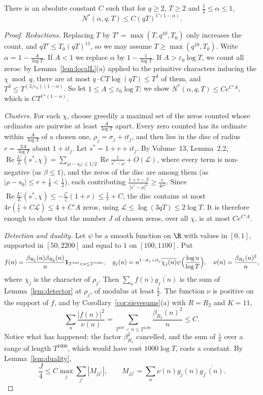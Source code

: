 \begin{theorem}\label{thm:logfree}
There is an absolute constant $C$ such that for $q\ge2$, $T\ge2$ and $\frac12\le\alpha\le1$,
\[
N^*(\alpha,q,T)\le C(qT)^{C(1-\alpha)}.
\]
\end{theorem}
\begin{proof}
\emph{Reductions.} Replacing $T$ by $T'=\max(T,q^{10},T_0)$ only increases the count, and $qT'\le T_0(qT)^{11}$, so we may assume $T\ge\max(q^{10},T_0)$. Write $\alpha=1-\frac A{\log T}$. If $A<1$ we replace $\alpha$ by $1-\frac1{\log T}$. If $A>\varepsilon_0\log T$, we count all zeros: by Lemma~\ref{lem:localL}(a) applied to the primitive characters inducing the $\chi\bmod q$, there are at most $q\cdot CT\log(qT)\le T^3$ of them, and $T^3\le T^{(3/\varepsilon_0)(1-\alpha)}$. So let $1\le A\le\varepsilon_0\log T$; we show $N^*(\alpha,q,T)\le Ce^{C'A}$, which is $CT^{C'(1-\alpha)}$.

\emph{Clusters.} For each $\chi$, choose greedily a maximal set of the zeros counted whose ordinates are pairwise at least $\frac A{\log T}$ apart. Every zero counted has its ordinate within $\frac A{\log T}$ of a chosen one, $\rho_j=\sigma_j+it_j$, and then lies in the disc of radius $r=\frac{2A}{\log T}$ about $1+it_j$. Let $s^*=1+r+it_j$. By Volume~13, Lemma~2.2, $\operatorname{Re}\frac{L'}L(s^*,\chi)=\sum_{|\rho-s_0|\le1/2}\operatorname{Re}\frac1{s^*-\rho}+O(\mathcal L)$, where every term is non-negative (as $\beta\le1$), and the zeros of the disc are among them (as $|\rho-s_0|\le r+\frac18<\frac12$), each contributing $\frac{1+r-\beta}{|s^*-\rho|^2}\ge\frac r{4r^2}$. Since $\operatorname{Re}\frac{L'}L(s^*,\chi)\le-\frac{\zeta'}\zeta(1+r)\le\frac1r+C$, the disc contains at most $4r(\frac1r+C\mathcal L)\le4+C'A$ zeros, using $\mathcal L\le\log(3qT)\le2\log T$. It is therefore enough to show that the number $J$ of chosen zeros, over all $\chi$, is at most $Ce^{C'A}$.

\emph{Detection and duality.} Let $\psi$ be a smooth function on $\R$ with values in $[0,1]$, supported in $[50,2200]$ and equal to $1$ on $[100,1100]$. Put
\[
f(n)=\frac{\beta_{R_1}(n)\beta_{R_2}(n)}n\mathbf 1_{T^{100}<n\le T^{1100}},\quad g_j(n)=n^{1-\sigma_j+it_j}\overline{\chi_j(n)}\psi\Bigl(\frac{\log n}{\log T}\Bigr),\quad\nu(n)=\frac{\beta_{R_1}(n)^2}n,
\]
where $\chi_j$ is the character of $\rho_j$. Then $\sum_nf(n)\overline{g_j(n)}$ is the sum of Lemma~\ref{lem:detector} at $\rho_j$, of modulus at least $\frac12$. The function $\nu$ is positive on the support of $f$, and by Corollary~\ref{cor:sievesums}(a) with $R=R_2$ and $K=11$,
\[
\sum_n\frac{|f(n)|^2}{\nu(n)}=\sum_{T^{100}<n\le T^{1100}}\frac{\beta_{R_2}(n)^2}n\le C.
\]
Notice what has happened: the factor $\beta_{R_1}^2$ cancelled, and the sum of $\frac1n$ over a range of length $T^{1000}$, which would have cost $1000\log T$, costs a constant. By Lemma~\ref{lem:duality},
\[
\frac J4\le C\max_j\sum_{j'}|M_{jj'}|,\qquad M_{jj'}=\sum_n\nu(n)g_j(n)\overline{g_{j'}(n)}.
\]


\end{proof}
